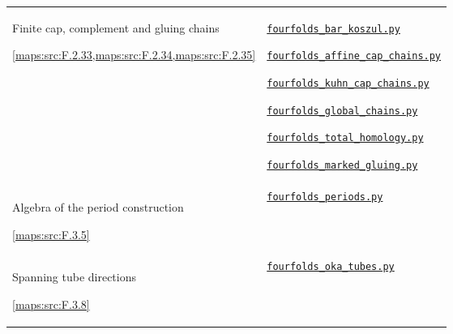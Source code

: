 \begin{longtable}{@{}p{}p{}@{}}
\hypertarget{prog:V:chains}{}Finite cap, complement and gluing chains\par \cref{maps:src:F.2.33,maps:src:F.2.34,maps:src:F.2.35} &
\href{https://github.com/KokunoYumeto/s6-complex-structure-workbench/blob/\SsixRepositoryCommit/pro_returns/S6_10_PAPERS_checkpoint_15_20261119T1045Z/S6_10_PAPERS/code/V/replay_chains/code/fourfolds_bar_koszul.py}{\nolinkurl{fourfolds_bar_koszul.py}}\par \href{https://github.com/KokunoYumeto/s6-complex-structure-workbench/blob/\SsixRepositoryCommit/pro_returns/S6_10_PAPERS_checkpoint_15_20261119T1045Z/S6_10_PAPERS/code/V/replay_chains/code/fourfolds_affine_cap_chains.py}{\nolinkurl{fourfolds_affine_cap_chains.py}}\par \href{https://github.com/KokunoYumeto/s6-complex-structure-workbench/blob/\SsixRepositoryCommit/pro_returns/S6_10_PAPERS_checkpoint_15_20261119T1045Z/S6_10_PAPERS/code/V/replay_chains/code/fourfolds_kuhn_cap_chains.py}{\nolinkurl{fourfolds_kuhn_cap_chains.py}}\par \href{https://github.com/KokunoYumeto/s6-complex-structure-workbench/blob/\SsixRepositoryCommit/pro_returns/S6_10_PAPERS_checkpoint_15_20261119T1045Z/S6_10_PAPERS/code/V/replay_chains/code/fourfolds_global_chains.py}{\nolinkurl{fourfolds_global_chains.py}}\par \href{https://github.com/KokunoYumeto/s6-complex-structure-workbench/blob/\SsixRepositoryCommit/pro_returns/S6_10_PAPERS_checkpoint_15_20261119T1045Z/S6_10_PAPERS/code/V/replay_chains/code/fourfolds_total_homology.py}{\nolinkurl{fourfolds_total_homology.py}}\par \href{https://github.com/KokunoYumeto/s6-complex-structure-workbench/blob/\SsixRepositoryCommit/pro_returns/S6_10_PAPERS_checkpoint_15_20261119T1045Z/S6_10_PAPERS/code/V/replay_chains/code/fourfolds_marked_gluing.py}{\nolinkurl{fourfolds_marked_gluing.py}} \\[3pt]
\hypertarget{prog:V:periods}{}Algebra of the period construction\par \cref{maps:src:F.3.5} &
\href{https://github.com/KokunoYumeto/s6-complex-structure-workbench/blob/\SsixRepositoryCommit/pro_returns/S6_10_PAPERS_checkpoint_15_20261119T1045Z/S6_10_PAPERS/code/V/replay_chains/code/fourfolds_periods.py}{\nolinkurl{fourfolds_periods.py}} \\[3pt]
\hypertarget{prog:V:tubes}{}Spanning tube directions\par \cref{maps:src:F.3.8} &
\href{https://github.com/KokunoYumeto/s6-complex-structure-workbench/blob/\SsixRepositoryCommit/pro_returns/S6_10_PAPERS_checkpoint_15_20261119T1045Z/S6_10_PAPERS/code/V/replay_chains/code/fourfolds_oka_tubes.py}{\nolinkurl{fourfolds_oka_tubes.py}} \\[3pt]

\end{longtable}
